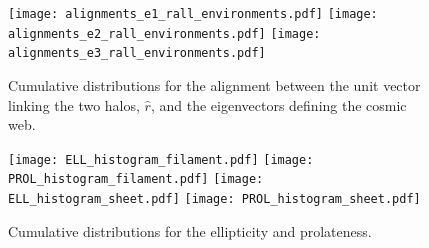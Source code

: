 \documentclass{emulateapj}
\begin{document}
\begin{figure}
\begin{center}
  \texttt{[image: alignments\_e1\_rall\_environments.pdf]} 
  \texttt{[image: alignments\_e2\_rall\_environments.pdf]} 
  \texttt{[image: alignments\_e3\_rall\_environments.pdf]} 
\end{center}
\caption{Cumulative distributions for the alignment between the unit
  vector linking the two halos, $\hat{r}$, and the eigenvectors
  defining the cosmic web.
    \label{fig:alignment_r}}  
\end{figure}



\begin{figure}
\begin{center}
  \texttt{[image: ELL\_histogram\_filament.pdf]}
  \texttt{[image: PROL\_histogram\_filament.pdf]}
  \texttt{[image: ELL\_histogram\_sheet.pdf]}
  \texttt{[image: PROL\_histogram\_sheet.pdf]}
\end{center}
\caption{Cumulative distributions for the ellipticity and prolateness.
    \label{fig:ELL_PROL}}  
\end{figure}
\end{document}
